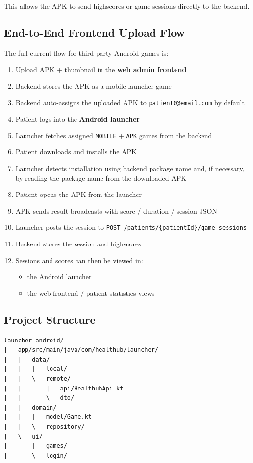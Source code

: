 This allows the APK to send highscores or game sessions directly to the
backend.

\subsection{End-to-End Frontend Upload
Flow}\label{end-to-end-frontend-upload-flow}

The full current flow for third-party Android games is:

\begin{enumerate}
\def\labelenumi{\arabic{enumi}.}
\tightlist
\item
  Upload APK + thumbnail in the \textbf{web admin frontend}
\item
  Backend stores the APK as a mobile launcher game
\item
  Backend auto-assigns the uploaded APK to \texttt{patient0@email.com}
  by default
\item
  Patient logs into the \textbf{Android launcher}
\item
  Launcher fetches assigned \texttt{MOBILE} + \texttt{APK} games from
  the backend
\item
  Patient downloads and installs the APK
\item
  Launcher detects installation using backend package name and, if
  necessary, by reading the package name from the downloaded APK
\item
  Patient opens the APK from the launcher
\item
  APK sends result broadcasts with score / duration / session JSON
\item
  Launcher posts the session to
  \texttt{POST\ /patients/\{patientId\}/game-sessions}
\item
  Backend stores the session and highscores
\item
  Sessions and scores can then be viewed in:

  \begin{itemize}
  \tightlist
  \item
    the Android launcher
  \item
    the web frontend / patient statistics views
  \end{itemize}
\end{enumerate}

\subsection{Project Structure}\label{project-structure}

\begin{verbatim}
launcher-android/
|-- app/src/main/java/com/healthub/launcher/
|   |-- data/
|   |   |-- local/
|   |   \-- remote/
|   |       |-- api/HealthubApi.kt
|   |       \-- dto/
|   |-- domain/
|   |   |-- model/Game.kt
|   |   \-- repository/
|   \-- ui/
|       |-- games/
|       \-- login/
\end{verbatim}
